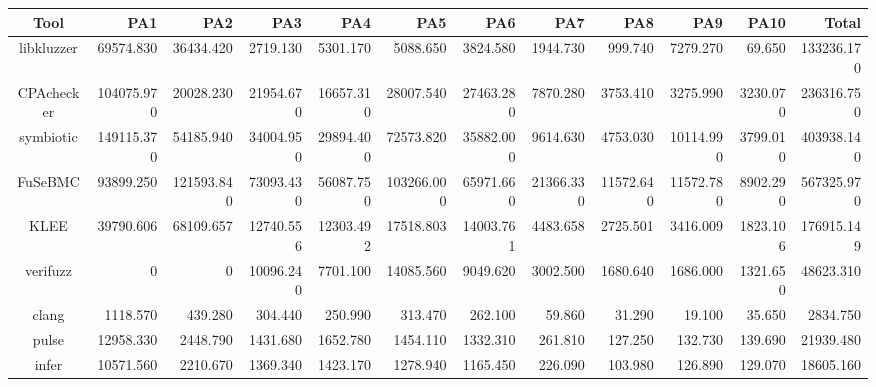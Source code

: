 \begin{table}
	\begin{center}
		\begin{tabular}{|c|r|r|r|r|r|r|r|r|r|r|r|}
			\hline
			Tool & PA1 & PA2 & PA3 & PA4 & PA5 & PA6 & PA7 & PA8 & PA9 & PA10 & Total \\
			\hline
			libkluzzer & 69574.830 & 36434.420 & 2719.130 & 5301.170 & 5088.650 & 3824.580 & 1944.730 & 999.740 & 7279.270 & 69.650 & 133236.170 \\
			\hline
			CPAchecker & 104075.970 & 20028.230 & 21954.670 & 16657.310 & 28007.540 & 27463.280 & 7870.280 & 3753.410 & 3275.990 & 3230.070 & 236316.750 \\
			\hline
			symbiotic & 149115.370 & 54185.940 & 34004.950 & 29894.400 & 72573.820 & 35882.000 & 9614.630 & 4753.030 & 10114.990 & 3799.010 & 403938.140 \\
			\hline
			FuSeBMC & 93899.250 & 121593.840 & 73093.430 & 56087.750 & 103266.000 & 65971.660 & 21366.330 & 11572.640 & 11572.780 & 8902.290 & 567325.970 \\
			\hline
			KLEE & 39790.606 & 68109.657 & 12740.556 & 12303.492 & 17518.803 & 14003.761 & 4483.658 & 2725.501 & 3416.009 & 1823.106 & 176915.149 \\
			\hline
			verifuzz & 0 & 0 & 10096.240 & 7701.100 & 14085.560 & 9049.620 & 3002.500 & 1680.640 & 1686.000 & 1321.650 & 48623.310 \\
			\hline
			clang & 1118.570 & 439.280 & 304.440 & 250.990 & 313.470 & 262.100 & 59.860 & 31.290 & 19.100 & 35.650 & 2834.750 \\
			\hline
			pulse & 12958.330 & 2448.790 & 1431.680 & 1652.780 & 1454.110 & 1332.310 & 261.810 & 127.250 & 132.730 & 139.690 & 21939.480 \\
			\hline
			infer & 10571.560 & 2210.670 & 1369.340 & 1423.170 & 1278.940 & 1165.450 & 226.090 & 103.980 & 126.890 & 129.070 & 18605.160 \\
			\hline
		\end{tabular}
	\end{center}
\end{table}